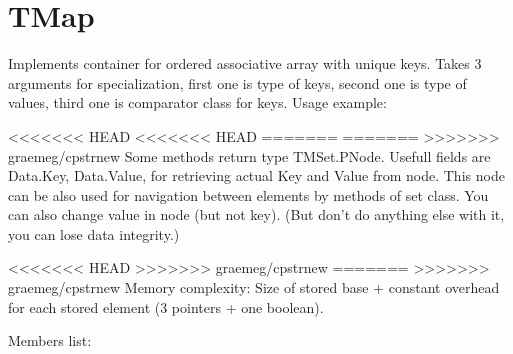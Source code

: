 \chapter{TMap}

Implements container for ordered associative array with unique keys.
Takes 3 arguments for specialization, first one is type of keys, second one is type of values, third
one is comparator class for keys.
Usage example:



<<<<<<< HEAD
<<<<<<< HEAD
=======
=======
>>>>>>> graemeg/cpstrnew
Some methods return type TMSet.PNode. Usefull fields are Data.Key, Data.Value, for retrieving
actual Key and Value from node. This node can be also used for navigation between elements by methods of set class.
You can also change value in node (but not key).
(But don't do anything else with it, you can lose data integrity.)

<<<<<<< HEAD
>>>>>>> graemeg/cpstrnew
=======
>>>>>>> graemeg/cpstrnew
Memory complexity:
Size of stored base + constant overhead for each stored element (3 pointers + one boolean).

Members list:

